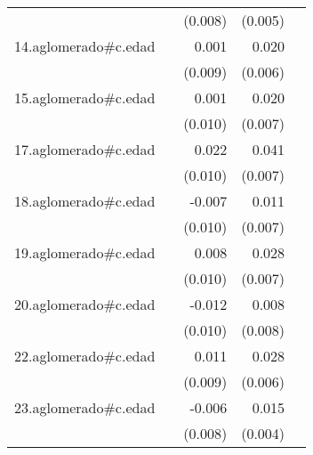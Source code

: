 {\begin{longtable}{l*{4}{D{.}{.}{-1}}}
            &                     &     (0.008)         &     (0.005)         &                     \\
\addlinespace
14.aglomerado#c.edad&                     &       0.001         &       0.020\sym{**} &                     \\
            &                     &     (0.009)         &     (0.006)         &                     \\
\addlinespace
15.aglomerado#c.edad&                     &       0.001         &       0.020\sym{**} &                     \\
            &                     &     (0.010)         &     (0.007)         &                     \\
\addlinespace
17.aglomerado#c.edad&                     &       0.022\sym{*}  &       0.041\sym{***}&                     \\
            &                     &     (0.010)         &     (0.007)         &                     \\
\addlinespace
18.aglomerado#c.edad&                     &      -0.007         &       0.011         &                     \\
            &                     &     (0.010)         &     (0.007)         &                     \\
\addlinespace
19.aglomerado#c.edad&                     &       0.008         &       0.028\sym{***}&                     \\
            &                     &     (0.010)         &     (0.007)         &                     \\
\addlinespace
20.aglomerado#c.edad&                     &      -0.012         &       0.008         &                     \\
            &                     &     (0.010)         &     (0.008)         &                     \\
\addlinespace
22.aglomerado#c.edad&                     &       0.011         &       0.028\sym{***}&                     \\
            &                     &     (0.009)         &     (0.006)         &                     \\
\addlinespace
23.aglomerado#c.edad&                     &      -0.006         &       0.015\sym{***}&                     \\
            &                     &     (0.008)         &     (0.004)         &                     \\

\end{longtable}}
